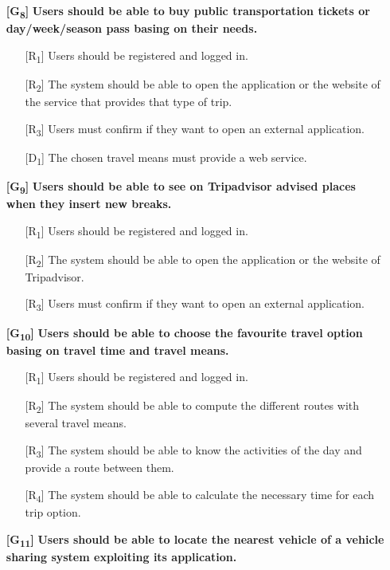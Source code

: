 \documentclass[12pt,titlepage]{article}
\begin{document}
\begin{itemize}
\item[\textbf{ {[G\textsubscript{8}]}}]	\textbf{	Users should be able to buy public transportation tickets or day/week/season pass basing on their needs.}
\begin{itemize}
\item[{[R\textsubscript{1}]}]  Users should be registered and logged in.
\item[{[R\textsubscript{2}]}]  The system should be able to open the application or the website of the service that provides that type of trip.
\item[{[R\textsubscript{3}]}] Users must confirm if they want to open an external application.
\item[{[D\textsubscript{1}]}]  The chosen travel means must provide a web service.
\end{itemize}
\item[\textbf{ {[G\textsubscript{9}]}}]	\textbf{	Users should be able to see on Tripadvisor advised places when they insert new breaks.}
\begin{itemize}
\item[{[R\textsubscript{1}]}]  Users should be registered and logged in.
\item[{[R\textsubscript{2}]}]  The system should be able to open the application or the website of Tripadvisor.
\item[{[R\textsubscript{3}]}] Users must confirm if they want to open an external application.
\end{itemize}
\item[\textbf{ {[G\textsubscript{10}]}}]	\textbf{	Users should be able to choose the favourite travel option basing on travel time and travel means.}
\begin{itemize}
\item[{[R\textsubscript{1}]}]  Users should be registered and logged in.
\item[{[R\textsubscript{2}]}]  The system should be able to compute the different routes with several travel means.
\item[{[R\textsubscript{3}]}] The system should be able to know the activities of the day and provide a route between them.
\item[{[R\textsubscript{4}]}] The system should be able to calculate the necessary time for each trip option.
\end{itemize}
\item[\textbf{ {[G\textsubscript{11}]}}]	\textbf{	Users should be able to locate the nearest vehicle of a vehicle sharing system exploiting its application.}

\end{itemize}
\end{document}
